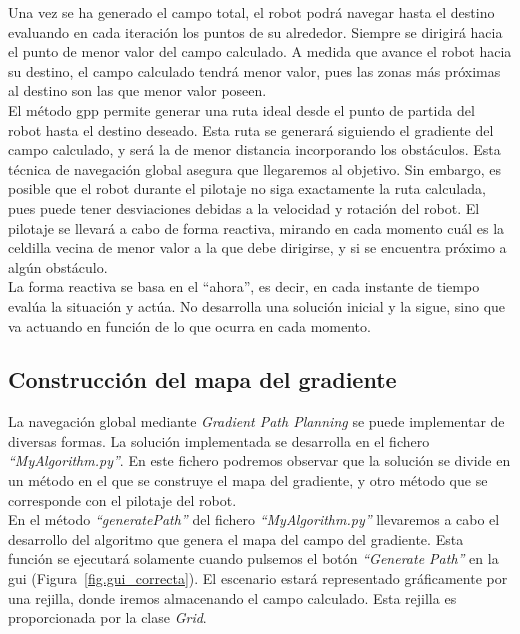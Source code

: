 Una vez se ha generado el campo total, el robot podrá navegar hasta el destino evaluando en cada iteración los puntos de su alrededor. Siempre se dirigirá hacia el punto de menor valor del campo calculado. A medida que avance el robot hacia su destino, el campo calculado tendrá menor valor, pues las zonas más próximas al destino son las que menor valor poseen.  \\

El método \acrshort{gpp} permite generar una ruta ideal desde el punto de partida del robot hasta el destino deseado. Esta ruta se generará siguiendo el gradiente del campo calculado, y será la de menor distancia incorporando los obstáculos. Esta técnica de navegación global asegura que llegaremos al objetivo. Sin embargo, es posible que el robot durante el pilotaje no siga exactamente la ruta calculada, pues puede tener desviaciones debidas a la velocidad y rotación del robot. El pilotaje se llevará a cabo de forma reactiva, mirando en cada momento cuál es la celdilla vecina de menor valor a la que debe dirigirse, y si se encuentra próximo a algún obstáculo.\\

La forma reactiva se basa en el ``ahora'', es decir, en cada instante de tiempo evalúa la situación y actúa. No desarrolla una solución inicial y la sigue, sino que va actuando en función de lo que ocurra en cada momento.

\subsection{Construcción del mapa del gradiente}
La navegación global mediante \textit{Gradient Path Planning} se puede implementar de diversas formas. La solución implementada  se desarrolla en el fichero \textit{``MyAlgorithm.py''}. En este fichero podremos observar que la solución se divide en un método en el que se construye el mapa del gradiente, y otro método que se corresponde con el pilotaje del robot.\\

En el método \textit{``generatePath''} del fichero \textit{``MyAlgorithm.py''} llevaremos a cabo el desarrollo del algoritmo que genera el mapa del campo del gradiente. Esta función se ejecutará solamente cuando pulsemos el botón \textit{``Generate Path''} en la \acrshort{gui} (Figura~\ref{fig.gui_correcta}). El escenario estará representado gráficamente por una rejilla, donde iremos almacenando el campo calculado. Esta rejilla es proporcionada por la clase \textit{Grid}.\\

